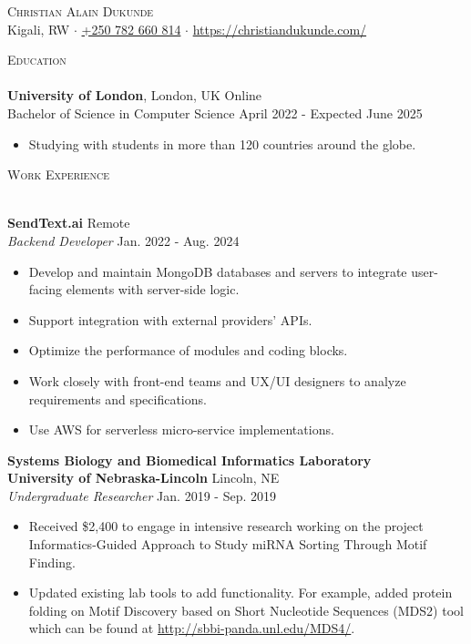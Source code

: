 \documentclass[a4paper]{article}
\newcommand{\lineunder} {
    \vspace*{-8pt} \\
    \hspace*{-18pt} \hrulefill \\
}
\newcommand{\header} [1] {
    {\hspace*{-18pt}\vspace*{6pt} \textsc{#1}}
    \vspace*{-6pt} \lineunder
}
\begin{document}
\vspace*{-40pt}

\vspace*{-10pt}
\begin{center}
	{\Huge \scshape {Christian Alain Dukunde}}\\
	Kigali, RW $\cdot$ \href{tel:+250782660814}{+250 782 660 814} $\cdot$ \url{https://christiandukunde.com/}\\
\end{center}

\header{Education}
\textbf{University of London}, London, UK Online\\
Bachelor of Science in Computer Science \hfill April 2022 - Expected June 2025\\
\begin{itemize} \itemsep 1pt
	\item Studying with students in more than 120 countries around the globe.
\end{itemize}
\vspace{2mm}

\header{Work Experience}
\vspace{1mm}

\textbf{SendText.ai} \hfill Remote\\
\textit{Backend Developer} \hfill Jan. 2022 - Aug. 2024\\
\vspace{-1mm}
\begin{itemize} \itemsep 1pt
	\item Develop and maintain MongoDB databases and servers to integrate user-facing elements with server-side logic.
	\item Support integration with external providers' APIs.
	\item Optimize the performance of modules and coding blocks.
	\item Work closely with front-end teams and UX/UI designers to analyze requirements and specifications.
	\item Use AWS for serverless micro-service implementations.
\end{itemize}

\textbf{Systems Biology and Biomedical Informatics Laboratory\\ University of Nebraska-Lincoln} \hfill Lincoln, NE\\
\textit{Undergraduate Researcher} \hfill Jan. 2019 - Sep. 2019\\
\vspace{-1mm}
\begin{itemize} \itemsep 1pt
	\item Received \$2,400 to engage in intensive research working on the project \textquotedbl{}Informatics-Guided Approach to Study miRNA Sorting Through Motif Finding\textquotedbl{}.
	\item Updated existing lab tools to add functionality. For example, added protein folding on Motif Discovery based on Short Nucleotide Sequences (MDS2) tool which can be found at \url{http://sbbi-panda.unl.edu/MDS4/}.
\end{itemize}
\end{document}
